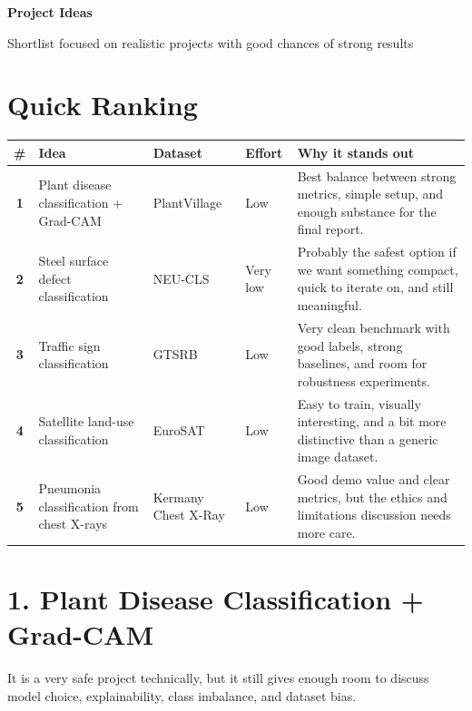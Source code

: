 \documentclass[11pt,a4paper]{article}
\begin{document}
{\huge\bfseries Project Ideas\par}
\vspace{0.25em}
{\large\color{textgray}Shortlist focused on realistic projects with good chances of strong results\par}

\vspace{1em}

\section{Quick Ranking}

\begin{tabularx}{\textwidth}{@{}>{\bfseries}c>{\raggedright\arraybackslash}p{4.1cm}>{\raggedright\arraybackslash}p{2.6cm}>{\raggedright\arraybackslash}p{2.0cm}X@{}}
\toprule
\textbf{\#} & \textbf{Idea} & \textbf{Dataset} & \textbf{Effort} & \textbf{Why it stands out} \\
\midrule
1 & Plant disease classification + Grad-CAM & PlantVillage & Low & Best balance between strong metrics, simple setup, and enough substance for the final report. \\
2 & Steel surface defect classification & NEU-CLS & Very low & Probably the safest option if we want something compact, quick to iterate on, and still meaningful. \\
3 & Traffic sign classification & GTSRB & Low & Very clean benchmark with good labels, strong baselines, and room for robustness experiments. \\
4 & Satellite land-use classification & EuroSAT & Low & Easy to train, visually interesting, and a bit more distinctive than a generic image dataset. \\
5 & Pneumonia classification from chest X-rays & Kermany Chest X-Ray & Low & Good demo value and clear metrics, but the ethics and limitations discussion needs more care. \\
\bottomrule
\end{tabularx}

\section{1. Plant Disease Classification + Grad-CAM}

It is a very safe project technically, but it still gives enough room to discuss model choice, explainability, class imbalance, and dataset bias.
\end{document}
